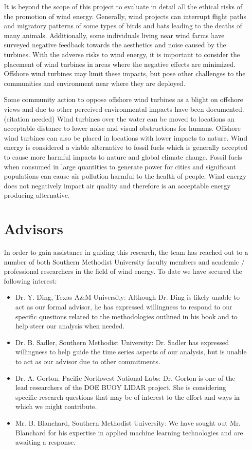 \documentclass{llncs}
\begin{document}
It is beyond the scope of this project to evaluate in detail all the ethical risks of the promotion of wind energy. Generally, wind projects can interrupt flight paths and migratory patterns of some types of birds and bats leading to the deaths of many animals. Additionally, some individuals living near wind farms have surveyed negative feedback towards the aesthetics and noise caused by the turbines. With the adverse risks to wind energy, it is important to consider the placement of wind turbines in areas where the negative effects are minimized. Offshore wind turbines may limit these impacts, but pose other challenges to the communities and environment near where they are deployed.

Some community action to oppose offshore wind turbines as a blight on offshore views and due to other perceived environmental impacts have been documented. (citation needed) Wind turbines over the water can be moved to locations an acceptable distance to lower noise and visual obstructions for humans. Offshore wind turbines can also be placed in locations with lower impacts to nature. Wind energy is considered a viable alternative to fossil fuels which is generally accepted to cause more harmful impacts to nature and global climate change. Fossil fuels when consumed in large quantities to generate power for cities and significant populations can cause air pollution harmful to the health of people. Wind energy does not negatively impact air quality and therefore is an acceptable energy producing alternative.

\section{Advisors}

In order to gain assistance in guiding this research, the team has reached out to a number of both Southern Methodist University faculty members and academic / professional researchers in the field of wind energy. To date we have secured the following interest:

\begin{itemize}
  \item Dr. Y. Ding, Texas A\&M University: Although Dr. Ding is likely unable to act as our formal advisor, he has expressed willingness to respond to our specific questions related to the methodologies outlined in his book and to help steer our analysis when needed.
  \item Dr. B. Sadler, Southern Methodist University: Dr. Sadler has expressed willingness to help guide the time series aspects of our analysis, but is unable to act as our advisor due to other commitments.
  \item Dr. A. Gorton, Pacific Northwest National Labs: Dr. Gorton is one of the lead researchers of the DOE BUOY LIDAR project. She is considering specific research questions that may be of interest to the effort and ways in which we might contribute.
  \item Mr. B. Blanchard, Southern Methodist University: We have sought out Mr. Blanchard for his expertise in applied machine learning technologies and are awaiting a response.
\end{itemize}

 
 

\end{document}
